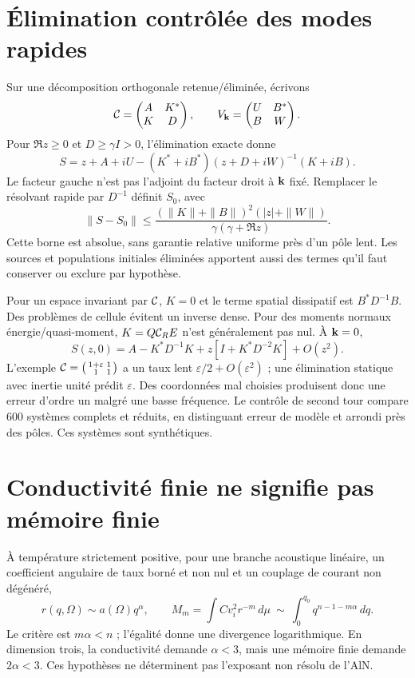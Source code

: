\documentclass[11pt,a4paper]{article}
\begin{document}
\section{Élimination contrôlée des modes rapides}
Sur une décomposition orthogonale retenue/éliminée, écrivons
\[
 {\cal C}=\begin{pmatrix}A&K^*\\K&D\end{pmatrix},\qquad
 V_{\bf k}=\begin{pmatrix}U&B^*\\B&W\end{pmatrix}.
\]
Pour $\Re z\ge0$ et $D\ge\gamma I>0$, l'élimination exacte donne
\[
 S=z+A+iU-(K^*+iB^*)(z+D+iW)^{-1}(K+iB).
\]
Le facteur gauche n'est pas l'adjoint du facteur droit à $ {\bf k}$ fixé.
Remplacer le résolvant rapide par $D^{-1}$ définit $S_0$, avec
\[
 \|S-S_0\|\le
 \frac{(\|K\|+\|B\|)^2(|z|+\|W\|)}
      {\gamma(\gamma+\Re z)}.
\]
Cette borne est absolue, sans garantie relative uniforme près d'un pôle lent.
Les sources et populations initiales éliminées apportent aussi des termes qu'il faut conserver ou exclure par hypothèse.

Pour un espace invariant par $ {\cal C}$, $K=0$ et le terme spatial dissipatif est $B^*D^{-1}B$.
Des problèmes de cellule évitent un inverse dense.
Pour des moments normaux énergie/quasi-moment, $K=Q{\cal C}_RE$ n'est généralement pas nul.
À $ {\bf k}=0$,
\[
 S(z,0)=A-K^*D^{-1}K+z[I+K^*D^{-2}K]+O(z^2).
\]
L'exemple $ {\cal C}=\bigl(\begin{smallmatrix}1+\varepsilon&1\\1&1\end{smallmatrix}\bigr)$ a un taux lent $\varepsilon/2+O(\varepsilon^2)$ ; une élimination statique avec inertie unité prédit $\varepsilon$.
Des coordonnées mal choisies produisent donc une erreur d'ordre un malgré une basse fréquence.
Le contrôle de second tour compare 600 systèmes complets et réduits, en distinguant erreur de modèle et arrondi près des pôles. Ces systèmes sont synthétiques.

\section{Conductivité finie ne signifie pas mémoire finie}
À température strictement positive, pour une branche acoustique linéaire, un coefficient angulaire de taux borné et non nul et un couplage de courant non dégénéré,
\[
 r(q,\Omega)\sim a(\Omega)q^\alpha,\qquad
 M_m=\int Cv_i^2r^{-m}\,d\mu
 \ \sim\ \int_0^{q_0}q^{n-1-m\alpha}\,dq .
\]
Le critère est $m\alpha<n$ ; l'égalité donne une divergence logarithmique.
En dimension trois, la conductivité demande $\alpha<3$, mais une mémoire finie demande $2\alpha<3$.
Ces hypothèses ne déterminent pas l'exposant non résolu de l'AlN.
\end{document}
